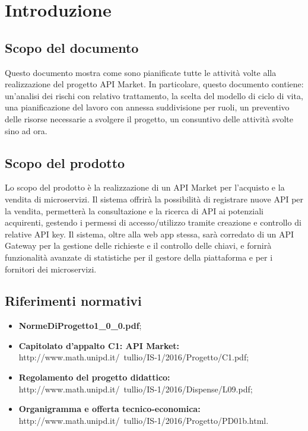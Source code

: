\newpage
\section{Introduzione}

\subsection{Scopo del documento}
Questo documento mostra come sono pianificate tutte le attività volte alla realizzazione del progetto API Market. In particolare, questo documento contiene: un'analisi dei rischi con relativo trattamento, la scelta del modello di ciclo di vita, una pianificazione del lavoro con annessa suddivisione per ruoli, un preventivo delle risorse necessarie a svolgere il progetto, un consuntivo delle attività svolte sino ad ora. 
\subsection{Scopo del prodotto}
Lo scopo del prodotto è la realizzazione di un API Market per l'acquisto e la vendita di microservizi. Il sistema offrirà la possibilità di registrare nuove API per la vendita, permetterà la consultazione e la ricerca di API ai potenziali acquirenti, gestendo i permessi di accesso/utilizzo tramite creazione e controllo di relative API key. Il sistema, oltre alla web app stessa, sarà corredato di un API Gateway per la gestione delle richieste e il controllo delle chiavi, e fornirà funzionalità avanzate di statistiche per il gestore della piattaforma e per i fornitori dei microservizi.

\subsection{Riferimenti normativi}
\begin{itemize}
\item \textbf{NormeDiProgetto1\_0\_0.pdf};
\item \textbf{Capitolato d’appalto C1: API Market:}\\http://www.math.unipd.it/~tullio/IS-1/2016/Progetto/C1.pdf;
\item \textbf{Regolamento del progetto didattico:}\\http://www.math.unipd.it/~tullio/IS-1/2016/Dispense/L09.pdf;
\item \textbf{Organigramma e offerta tecnico-economica:}\\http://www.math.unipd.it/~tullio/IS-1/2016/Progetto/PD01b.html.
\end{itemize}

